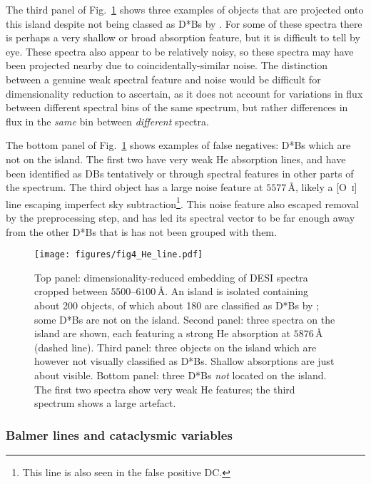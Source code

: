 \documentclass[fleqn,usenatbib]{mnras}
\begin{document}
The third panel of Fig.~\ref{fig:He_lines} shows three examples of objects that are projected onto this island despite not being classed as D*Bs by \citet{manser24}.
For some of these spectra there is perhaps a very shallow or broad absorption feature, but it is difficult to tell by eye.
These spectra also appear to be relatively noisy, so these spectra may have been projected nearby due to coincidentally-similar noise.
The distinction between a genuine weak spectral feature and noise would be difficult for dimensionality reduction to ascertain, as it does not account for variations in flux between different spectral bins of the same spectrum, but rather differences in flux in the \textit{same} bin between \textit{different} spectra.

The bottom panel of Fig.~\ref{fig:He_lines} shows examples of false negatives: D*Bs which are not on the island.
The first two have very weak He absorption lines, and have been identified as DBs tentatively or through spectral features in other parts of the spectrum.
The third object has a large noise feature at $5577\,\text{\AA}$, likely a [O~\textsc{i}] line escaping imperfect sky subtraction\footnote{
    This line is also seen in the false positive DC.
}.
This noise feature also escaped removal by the preprocessing step, and has led its spectral vector to be far enough away from the other D*Bs that is has not been grouped with them.

\begin{figure}
\centering
\texttt{[image: figures/fig4\_He\_line.pdf]}
\caption{
    Top panel: dimensionality-reduced embedding of DESI spectra cropped between $5500$--$6100\,\text{\AA}$.
    An island is isolated containing about 200 objects, of which about 180 are classified as D*Bs by \citet{manser24}; some D*Bs are not on the island.
    Second panel: three spectra on the island are shown, each featuring a strong He absorption at $5876\,\text{\AA}$ (dashed line).
    Third panel: three objects on the island which are however not visually  classified as D*Bs.
    Shallow absorptions are just about visible.
    Bottom panel: three D*Bs \textit{not} located on the island.
    The first two spectra show very weak He features; the third spectrum shows a large artefact.
}
\label{fig:He_lines}
\end{figure}

\subsubsection{Balmer lines and cataclysmic variables}
\label{sec:CVs}
\end{document}
